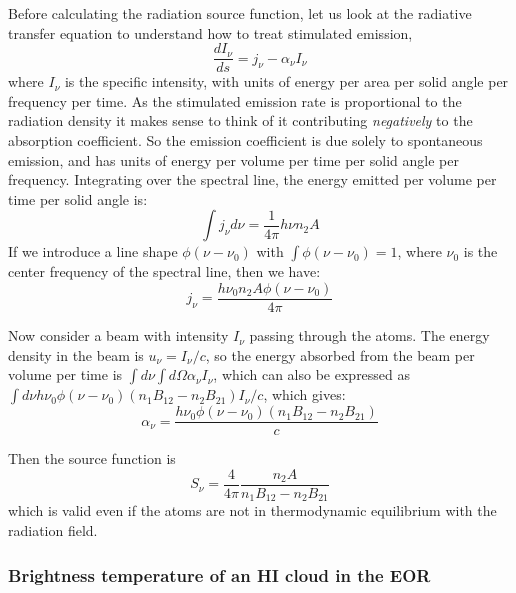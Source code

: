 Before calculating the radiation source function, let us look at the radiative transfer equation to understand how to treat stimulated emission,
\begin{equation}
\frac{dI_\nu}{ds}=j_\nu-\alpha_\nu I_\nu
\end{equation}
where $I_\nu$ is the specific intensity, with units of energy per area per solid angle per frequency per time. As the stimulated emission rate is proportional to the radiation density it makes sense to think of it contributing \textit{negatively} to the absorption coefficient. So the emission coefficient is due solely to spontaneous emission, and has units of energy per volume per time per solid angle per frequency. Integrating over the spectral line, the energy emitted per volume per time per solid angle is:
\begin{equation}
\int j_\nu d\nu=\frac{1}{4\pi}h\nu n_2 A
\end{equation}
If we introduce a line shape $\phi(\nu-\nu_0)$ with $\int\phi(\nu-\nu_0)=1$, where $\nu_0$ is the center frequency of the spectral line, then we have:
\begin{equation}
j_\nu=\frac{h\nu_0 n_2A\phi(\nu-\nu_0)}{4\pi}
\end{equation}

Now consider a beam with intensity $I_\nu$ passing through the atoms. The energy density in the beam is $u_\nu=I_\nu/c$, so the energy absorbed from the beam per volume per time is $\int d\nu\int d\Omega\alpha_\nu I_\nu$, which can also be expressed as $\int d\nu h\nu_0\phi(\nu-\nu_0)(n_1B_{12}-n_2B_{21})I_\nu/c$, which gives:
\begin{equation}
\alpha_\nu=\frac{h\nu_0\phi(\nu-\nu_0)(n_1B_{12}-n_2B_{21})}{c}
\end{equation}

Then the source function is
\begin{equation}
S_\nu=\frac{4}{4\pi}\frac{ n_2A}{n_1B_{12}-n_2B_{21}}
\end{equation}
which is valid even if the atoms are not in thermodynamic equilibrium with the radiation field. 

\subsubsection{Brightness temperature of an HI cloud in the EOR}

